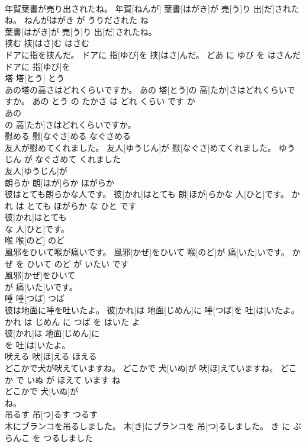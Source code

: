 \documentclass[8pt]{extreport}
\begin{document}
\begin{CJK}{UTF8}{min}
\\	年賀葉書が売り出されたね。	年賀[ねんが] 葉書[はがき]が 売[う]り 出[だ]されたね。	ねんがはがき が うりだされた ね	
\\	葉書[はがき]が 売[う]り 出[だ]されたね。			
\\	挟む	挟[はさ]む	はさむ	
\\	ドアに指を挟んだ。	ドアに 指[ゆび]を 挟[はさ]んだ。	どあ に ゆび を はさんだ	
\\	ドアに 指[ゆび]を
\\	塔	塔[とう]	とう	
\\	あの塔の高さはどれくらいですか。	あの 塔[とう]の 高[たか]さはどれくらいですか。	あの とう の たかさ は どれ くらい です か	
\\	あの
\\	の 高[たか]さはどれくらいですか。			
\\	慰める	慰[なぐさ]める	なぐさめる	
\\	友人が慰めてくれました。	友人[ゆうじん]が 慰[なぐさ]めてくれました。	ゆうじん が なぐさめて くれました	
\\	友人[ゆうじん]が
\\	朗らか	朗[ほが]らか	ほがらか	
\\	彼はとても朗らかな人です。	彼[かれ]はとても 朗[ほが]らかな 人[ひと]です。	かれ は とても ほがらか な ひと です	
\\	彼[かれ]はとても
\\	な 人[ひと]です。			
\\	喉	喉[のど]	のど	
\\	風邪をひいて喉が痛いです。	風邪[かぜ]をひいて 喉[のど]が 痛[いた]いです。	かぜ を ひいて のど が いたい です	
\\	風邪[かぜ]をひいて
\\	が 痛[いた]いです。			
\\	唾	唾[つば]	つば	
\\	彼は地面に唾を吐いたよ。	彼[かれ]は 地面[じめん]に 唾[つば]を 吐[は]いたよ。	かれ は じめん に つば を はいた よ	
\\	彼[かれ]は 地面[じめん]に
\\	を 吐[は]いたよ。			
\\	吠える	吠[ほ]える	ほえる	
\\	どこかで犬が吠えていますね。	どこかで 犬[いぬ]が 吠[ほ]えていますね。	どこか で いぬ が ほえて います ね	
\\	どこかで 犬[いぬ]が
\\	ね。			
\\	吊るす	吊[つ]るす	つるす	
\\	木にブランコを吊るしました。	木[き]にブランコを 吊[つ]るしました。	き に ぶらんこ を つるしました	

\end{CJK}
\end{document}

